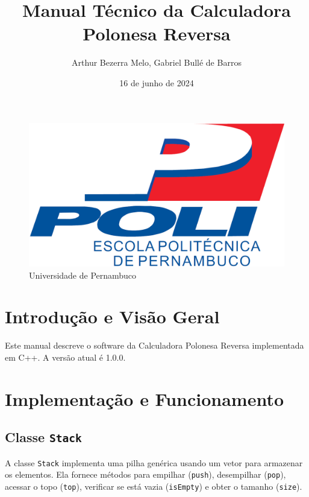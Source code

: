 \documentclass[a4paper,12pt]{article}
\title{Manual Técnico da Calculadora Polonesa Reversa}
\author{Arthur Bezerra Melo, Gabriel Bullé de Barros}
\date{16 de junho de 2024}
\begin{document}
\maketitle

\begin{figure}[h]
    \centering
    \includegraphics[width=0.5\linewidth]{logo-poli.png}
    \caption{Universidade de Pernambuco}
    \label{fig:logo-poli.png}
\end{figure}

\section{Introdução e Visão Geral}

Este manual descreve o software da Calculadora Polonesa Reversa implementada em C++. A versão atual é 1.0.0.

\section{Implementação e Funcionamento}

\subsection{Classe \texttt{Stack}}
A classe \texttt{Stack} implementa uma pilha genérica usando um vetor para armazenar os elementos. Ela fornece métodos para empilhar (\texttt{push}), desempilhar (\texttt{pop}), acessar o topo (\texttt{top}), verificar se está vazia (\texttt{isEmpty}) e obter o tamanho (\texttt{size}).

\vspace{20pt}
\end{document}
